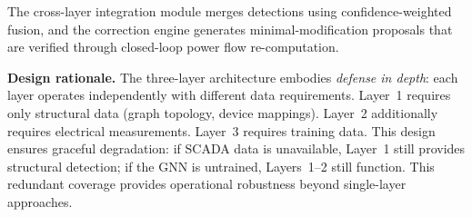 \documentclass[research]{fcs}
\begin{document}
The cross-layer integration module merges detections using confidence-weighted fusion, and the correction engine generates minimal-modification proposals that are verified through closed-loop power flow re-computation.

\textbf{Design rationale.} The three-layer architecture embodies \emph{defense in depth}: each layer operates independently with different data requirements. Layer~1 requires only structural data (graph topology, device mappings). Layer~2 additionally requires electrical measurements. Layer~3 requires training data. This design ensures graceful degradation: if SCADA data is unavailable, Layer~1 still provides structural detection; if the GNN is untrained, Layers~1--2 still function. This redundant coverage provides operational robustness beyond single-layer approaches.
\end{document}
